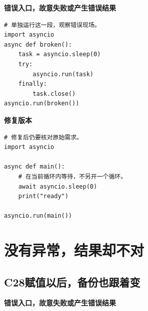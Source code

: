 



\textbf{错误入口，故意失败或产生错误结果}

\begin{lstlisting}[style=errorcode,title={错误复现（故意失败或错误结果）：\code{case_27_bad.py.txt}}]
# 单独运行这一段，观察错误现场。
import asyncio
async def broken():
    task = asyncio.sleep(0)
    try:
        asyncio.run(task)
    finally:
        task.close()
asyncio.run(broken())
\end{lstlisting}

\textbf{修复版本}

\begin{lstlisting}[title={\code{case_27.py}}]
# 修复后仍要核对原始需求。
import asyncio

async def main():
    # 在当前循环内等待，不另开一个循环。
    await asyncio.sleep(0)
    print("ready")

asyncio.run(main())
\end{lstlisting}


\section{没有异常，结果却不对}

\subsection*{C28\enspace 赋值以后，备份也跟着变}





\textbf{错误入口，故意失败或产生错误结果}

